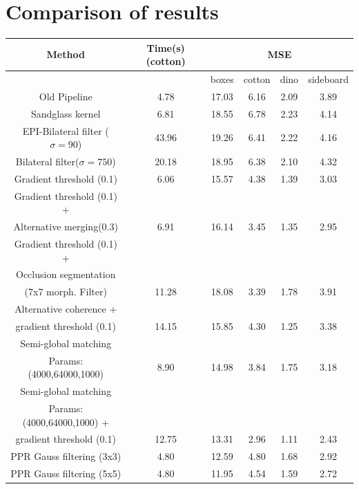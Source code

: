 \documentclass  [
  paper    = a4,
  BCOR     = 10mm,
  twoside,
  fontsize = 12pt,
  fleqn,
  toc      = bibnumbered,
  toc      = listofnumbered,
  numbers  = noendperiod,
  headings = normal,
  listof   = leveldown,
  version  = 3.03
]                                       {scrreprt}
\begin{document}
\section{Comparison of results}\label{sec:comparison}
\begin{table}[h!]
	\centering
	\begin{tabular}{|c|c|c|c|c|c|}
		\hline 
		Method & Time(s) (cotton) & \multicolumn{4}{c|}{MSE} \\ 
		\hline 
		&  & boxes & cotton & dino & sideboard \\ 
		\hline
		Old Pipeline & 4.78 & 17.03 & 6.16 & 2.09 & 3.89 \\
		\hline 
		Sandglass kernel & 6.81  & 18.55  & 6.78  & 2.23  & 4.14 \\ 
		\hline 
		EPI-Bilateral filter ($\sigma = 90$) &  43.96 &  19.26  & 6.41  & 2.22  & 4.16  \\ 
		\hline 
		Bilateral filter($\sigma = 750$) & 20.18  & 18.95  &  6.38 & 2.10  &4.32  \\ 
		\hline 
		Gradient threshold (0.1) & 6.06 & 15.57  & 4.38  & 1.39  & 3.03  \\ 
		\hline 
		Gradient threshold (0.1) +&&&&&\\
		 Alternative merging(0.3) & 6.91 & 16.14 & 3.45 & 1.35 & 2.95 \\
		\hline
		Gradient threshold (0.1) + &&&&&\\Occlusion segmentation&&&&&\\(7x7 morph. Filter) & 11.28  & 18.08 &  3.39 & 1.78  & 3.91  \\ 
		\hline 
		Alternative coherence +&&&&&\\gradient threshold (0.1) & 14.15  & 15.85  & 4.30  & 1.25  & 3.38  \\ 
		\hline 
		Semi-global matching&&&&&\\
		Params: (4000,64000,1000) & 8.90 & 14.98  & 3.84  & 1.75  & 3.18  \\ 
		\hline 
		Semi-global matching&&&&&\\
		Params: (4000,64000,1000) +&&&&&\\
		gradient threshold (0.1) & 12.75  & 13.31  & 2.96   & 1.11   & 2.43 \\ 
		\hline 
		\hline
		PPR Gauss filtering (3x3) & 4.80 & 12.59 & 4.80 & 1.68 & 2.92 \\
		\hline
		PPR Gauss filtering (5x5) &4.80 & 11.95 & 4.54 & 1.59 &  2.72 \\

\end{tabular}
\end{table}
\end{document}

